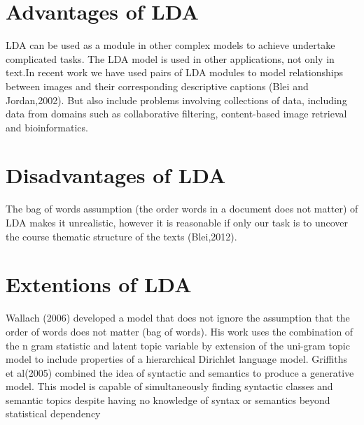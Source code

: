 \section{Advantages of LDA} 
LDA can be used as a module in other complex models to achieve undertake complicated tasks.
The LDA model is used in other applications, not only in text.In recent work we have used pairs of LDA modules to
model relationships between images and their corresponding descriptive captions (Blei and Jordan,2002). But also include problems involving collections of data, including data from domains such as collaborative filtering,
content-based image retrieval and bioinformatics.
\section{Disadvantages of LDA}
The bag of words assumption (the order words in a document does not matter) of LDA makes it unrealistic, however it is reasonable if only our task is to uncover the course thematic structure of the texts (Blei,2012).
\section{Extentions of LDA}
Wallach (2006) developed a model that does not ignore the assumption that the order of words does not matter (bag of words). His work uses the combination of the n gram statistic and latent topic variable by extension of the uni-gram topic model to include properties of a hierarchical Dirichlet language model.
Griffiths et al(2005) combined the idea of syntactic and semantics to produce a generative model. This model  is capable of simultaneously finding syntactic classes and semantic topics despite having no knowledge of syntax or semantics beyond statistical dependency
%
%
%
